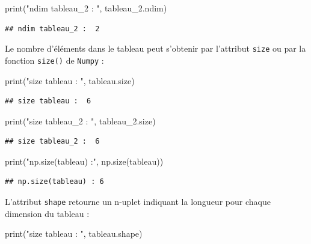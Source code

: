 \documentclass[
  12pt,
]{book}
\newenvironment{Shaded}{\begin{snugshade}}{\end{snugshade}}
\newcommand{\BuiltInTok}[1]{#1}
\newcommand{\NormalTok}[1]{#1}
\newcommand{\StringTok}[1]{\textcolor[rgb]{0.31,0.60,0.02}{#1}}
\numberwithin{equation}{section}
\numberwithin{countremarque}{section}
\begin{document}
\begin{Shaded}
\begin{Highlighting}[]
\BuiltInTok{print}\NormalTok{(}\StringTok{"ndim tableau\_2 : "}\NormalTok{, tableau\_2.ndim)}
\end{Highlighting}
\end{Shaded}

\begin{lstlisting}
## ndim tableau_2 :  2
\end{lstlisting}

Le nombre d'éléments dans le tableau peut s'obtenir par l'attribut \texttt{size} ou par la fonction \texttt{size()} de \texttt{Numpy} :

\begin{Shaded}
\begin{Highlighting}[]
\BuiltInTok{print}\NormalTok{(}\StringTok{"size tableau : "}\NormalTok{, tableau.size)}
\end{Highlighting}
\end{Shaded}

\begin{lstlisting}
## size tableau :  6
\end{lstlisting}

\begin{Shaded}
\begin{Highlighting}[]
\BuiltInTok{print}\NormalTok{(}\StringTok{"size tableau\_2 : "}\NormalTok{, tableau\_2.size)}
\end{Highlighting}
\end{Shaded}

\begin{lstlisting}
## size tableau_2 :  6
\end{lstlisting}

\begin{Shaded}
\begin{Highlighting}[]
\BuiltInTok{print}\NormalTok{(}\StringTok{"np.size(tableau) :"}\NormalTok{, np.size(tableau))}
\end{Highlighting}
\end{Shaded}

\begin{lstlisting}
## np.size(tableau) : 6
\end{lstlisting}

L'attribut \texttt{shape} retourne un n-uplet indiquant la longueur pour chaque dimension du tableau :

\begin{Shaded}
\begin{Highlighting}[]
\BuiltInTok{print}\NormalTok{(}\StringTok{"size tableau : "}\NormalTok{, tableau.shape)}
\end{Highlighting}
\end{Shaded}
\end{document}
